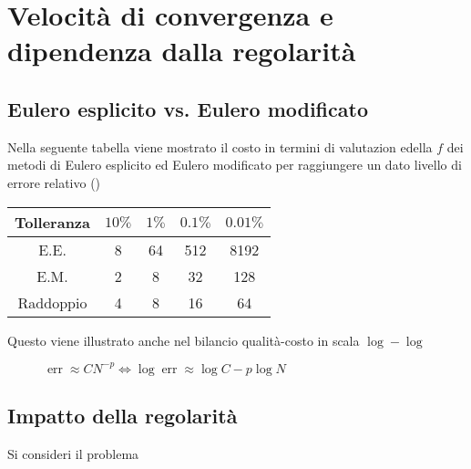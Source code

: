 \documentclass[hidelinks, 10pt]{report}
\begin{document}
\section{Velocit\`a di convergenza e dipendenza dalla regolarit\`a}
\subsection{Eulero esplicito vs. Eulero modificato}

Nella seguente tabella viene mostrato il costo in termini di valutazion edella $ f $ dei metodi di Eulero esplicito ed Eulero modificato per raggiungere un dato livello di errore relativo ()	%

\begin{tabular}{c|c|c|c|c}
	Tolleranza & $ 10\% $ & $ 1\% $ & $ 0.1\% $ & $ 0.01\% $ \\
\hline
	E.E. & 8 & 64 & 512 & 8192 \\
\hline
	E.M. & 2 & 8 & 32 & 128 \\
\hline
	Raddoppio & 4 & 8 & 16 & 64 \\
\end{tabular}

Questo viene illustrato anche nel bilancio qualit\`a-costo in scala $ \log-\log $

\begin{figure}[H]
\begin{center}

\caption{$ \mathop{err} \approx C N^{-p} \iff \log \mathop{err} \approx \log C - p \log N $}
\end{center}
\end{figure}

\subsection{Impatto della regolarit\`a}
Si consideri il problema
\end{document}
